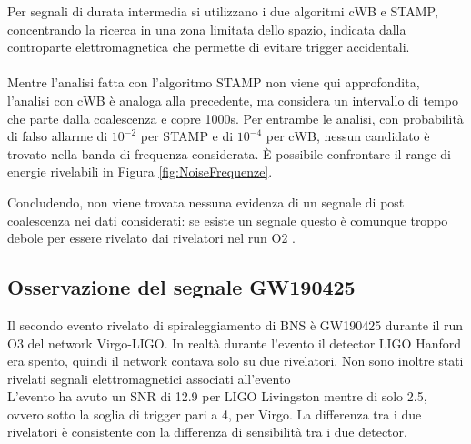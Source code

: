 Per segnali di durata intermedia si utilizzano i due algoritmi cWB e STAMP, concentrando la ricerca in una zona limitata dello spazio, indicata dalla controparte elettromagnetica che permette di evitare trigger accidentali.\\
\\
Mentre l'analisi fatta con l'algoritmo STAMP non viene qui approfondita, l'analisi con cWB è analoga alla precedente, ma considera un intervallo di tempo che parte dalla coalescenza e copre 1000s. Per entrambe le analisi, con probabilità di falso allarme di $10^{-2}$ per STAMP e di $10^{-4}$ per cWB, nessun candidato è trovato nella banda di frequenza considerata. È possibile confrontare il range di energie rivelabili in Figura \ref{fig:NoiseFrequenze}.

Concludendo, non viene trovata nessuna evidenza di un segnale di post coalescenza nei dati considerati: se esiste un segnale questo è comunque troppo debole per essere rivelato dai rivelatori nel run O2 \cite{Abbott_2017b}.

\subsection{Osservazione del segnale GW190425}
Il secondo evento rivelato di spiraleggiamento di BNS è GW190425 durante il run O3 del network Virgo-LIGO. In realtà durante l'evento il detector LIGO Hanford era spento, quindi il network contava solo su due rivelatori. Non sono inoltre stati rivelati segnali elettromagnetici associati all'evento\\
L'evento ha avuto un SNR di 12.9 per LIGO Livingston mentre di solo 2.5, ovvero sotto la soglia di trigger pari a 4, per Virgo. La differenza tra i due rivelatori è consistente con la differenza di sensibilità tra i due detector\cite{Abbott_2020b}.

